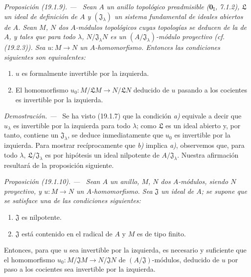 \documentclass[10pt,oneside]{book}
\makeatletter
\newcommand{\setmanualcurrentlabel}[1]{\def\@currentlabel{#1}}
\newcommand{\oldpage}[2][]{%
  \setcounter{footnote}{0}%
  \marginpar{\scriptsize\textbf{#1}~|~#2}\ignorespaces}
\newenvironment{proposition}[1][]{%
  \setmanualcurrentlabel{#1}\par\medskip\noindent\itshape Proposición (#1). ---\ }{\par}
\newenvironment{proof}{%
  \par\medskip\noindent\textit{Demostración. ---\ }}{\par}
\makeatother
\begin{document}
\begin{proposition}[19.1.9]
\label{0.19.1.9-es}
Sean $A$ un anillo topológico \textup{preadmisible ($\mathbf{0}_{\mathrm I}$,
7.1.2)}, $\mathfrak L$ un ideal de definición de $A$ y
$(\mathfrak J_\lambda)$ un sistema fundamental de ideales abiertos de $A$.
Sean $M$, $N$ dos $A$-módulos topológicos cuyas topologías se deducen
de la de $A$, y tales que para todo $\lambda$,
$N/\mathfrak J_\lambda N$ es un $(A/\mathfrak J_\lambda)$-módulo proyectivo
\textup{(cf. (19.2.3))}. Sea $u:M\to N$ un $A$-homomorfismo. Entonces las condiciones
siguientes son equivalentes:
\begin{enumerate}
  \item[\textup{a)}] $u$ es formalmente invertible por la izquierda.

  \oldpage[0\textsubscript{IV-1}]{75}

  \item[\textup{b)}] El homomorfismo
  $u_0:M/\mathfrak LM\to N/\mathfrak LN$ deducido de $u$ pasando a los
  cocientes es invertible por la izquierda.
\end{enumerate}
\end{proposition}

\begin{proof}
Se ha visto (19.1.7) que la condición \emph{a)} equivale a decir que $u_\lambda$ es
invertible por la izquierda para todo $\lambda$; como $\mathfrak L$ es un ideal
abierto y, por tanto, contiene un $\mathfrak J_\lambda$, se deduce inmediatamente que
$u_0$ es invertible por la izquierda. Para mostrar recíprocamente que \emph{b)} implica \emph{a)},
observemos que, para todo $\lambda$, $\mathfrak L/\mathfrak J_\lambda$ es por
hipótesis un ideal nilpotente de $A/\mathfrak J_\lambda$. Nuestra afirmación
resultará de la proposición siguiente.
\end{proof}

\begin{proposition}[19.1.10]
\label{0.19.1.10-es}
Sean $A$ un anillo, $M$, $N$ dos $A$-módulos, siendo $N$ proyectivo, y
$u:M\to N$ un $A$-homomorfismo. Sea $\mathfrak J$ un ideal de $A$; se
supone que se satisface \textup{una} de las condiciones siguientes:
\begin{enumerate}
  \item[\textup{(i)}] $\mathfrak J$ es nilpotente.
  \item[\textup{(ii)}] $\mathfrak J$ está contenido en el radical de $A$ y $M$ es de
  tipo finito.
\end{enumerate}
Entonces, para que $u$ sea invertible por la izquierda, es necesario y suficiente que
el homomorfismo
$u_0:M/\mathfrak JM\to N/\mathfrak JN$ de $(A/\mathfrak J)$-módulos, deducido
de $u$ por paso a los cocientes sea invertible por la izquierda.
\end{proposition}
\end{document}
